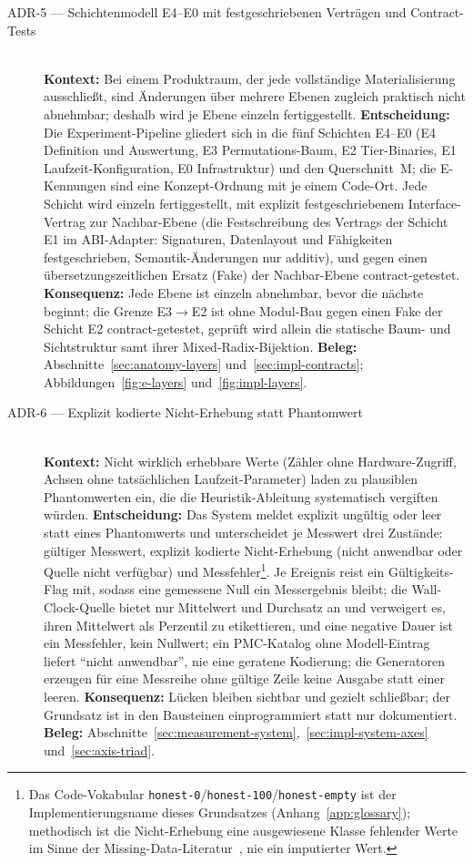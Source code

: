 \begin{description}
  \item[ADR-5 --- Schichtenmodell E4--E0 mit festgeschriebenen Verträgen und Contract-Tests]\hfill\\
  \textbf{Kontext:} Bei einem Produktraum, der jede vollständige Materialisierung ausschließt, sind
  Änderungen über mehrere Ebenen zugleich praktisch nicht abnehmbar; deshalb wird je Ebene einzeln
  fertiggestellt.
  \textbf{Entscheidung:} Die Experiment-Pipeline gliedert sich in die fünf Schichten E4--E0 (E4
  Definition und Auswertung, E3 Permutations-Baum, E2 Tier-Binaries, E1 Laufzeit-Konfiguration, E0
  Infrastruktur) und den Querschnitt~M\@; die E-Kennungen sind eine Konzept-Ordnung mit je einem
  Code-Ort. Jede Schicht wird einzeln fertiggestellt, mit explizit festgeschriebenem Interface-Vertrag zur
  Nachbar-Ebene (die Festschreibung des Vertrags der Schicht E1 im ABI-Adapter: Signaturen, Datenlayout
  und Fähigkeiten festgeschrieben, Semantik-Änderungen nur additiv), und gegen einen übersetzungszeitlichen
  Ersatz (Fake) der Nachbar-Ebene contract-getestet.
  \textbf{Konsequenz:} Jede Ebene ist einzeln abnehmbar, bevor die nächste beginnt; die Grenze
  E3$\to$E2 ist ohne Modul-Bau gegen einen Fake der Schicht E2 contract-getestet, geprüft wird allein
  die statische Baum- und Sichtstruktur samt ihrer Mixed-Radix-Bijektion.
  \textbf{Beleg:} Abschnitte~\ref{sec:anatomy-layers} und~\ref{sec:impl-contracts};
  Abbildungen~\ref{fig:e-layers} und~\ref{fig:impl-layers}.

  \item[ADR-6 --- Explizit kodierte Nicht-Erhebung statt Phantomwert]\hfill\\
  \textbf{Kontext:} Nicht wirklich erhebbare Werte (Zähler ohne Hardware-Zugriff, Achsen ohne
  tatsächlichen Laufzeit-Parameter) laden zu plausiblen Phantomwerten ein, die die Heuristik-Ableitung
  systematisch vergiften würden.
  \textbf{Entscheidung:} Das System meldet explizit ungültig oder leer statt eines Phantomwerts und
  unterscheidet je Messwert drei Zustände: gültiger Messwert, explizit kodierte Nicht-Erhebung (nicht
  anwendbar oder Quelle nicht verfügbar) und Messfehler\footnote{Das Code-Vokabular
  \texttt{honest-0}/\texttt{honest-100}/\texttt{honest-empty} ist der Implementierungsname dieses
  Grundsatzes (Anhang~\ref{app:glossary});
  methodisch ist die Nicht-Erhebung eine ausgewiesene Klasse fehlender Werte im Sinne der
  Missing-Data-Literatur~\cite{graham2009missing}, nie ein imputierter Wert.}. Je Ereignis reist ein
  Gültigkeits-Flag mit, sodass eine gemessene Null ein Messergebnis bleibt; die Wall-Clock-Quelle bietet nur
  Mittelwert und Durchsatz an und verweigert es, ihren Mittelwert als Perzentil zu etikettieren, und
  eine negative Dauer ist ein Messfehler, kein Nullwert; ein PMC-Katalog ohne Modell-Eintrag liefert
  \enquote{nicht anwendbar}, nie eine geratene Kodierung; die Generatoren erzeugen für eine Messreihe
  ohne gültige Zeile keine Ausgabe statt einer leeren.
  \textbf{Konsequenz:} Lücken bleiben sichtbar und gezielt schließbar; der Grundsatz ist in den
  Bausteinen einprogrammiert statt nur dokumentiert.
  \textbf{Beleg:} Abschnitte~\ref{sec:measurement-system},~\ref{sec:impl-system-axes}
  und~\ref{sec:axis-triad}.


\end{description}
